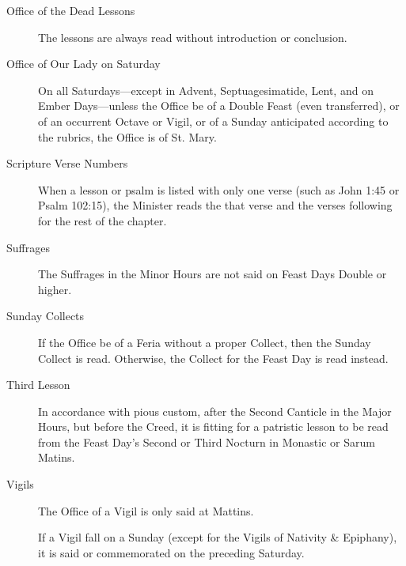 \begin{description}
\item[Office of the Dead Lessons] The lessons are always read without introduction or conclusion.
\item[Office of Our Lady on Saturday] On all Saturdays---except in Advent, Septuagesimatide, Lent, and on Ember Days---unless the Office be of a Double Feast (even transferred), or of an occurrent Octave or Vigil, or of a Sunday anticipated according to the rubrics, the Office is of St. Mary.
\item[Scripture Verse Numbers] When a lesson or psalm is listed with only one verse (such as John 1:45 or Psalm 102:15), the Minister reads the that verse and the verses following for the rest of the chapter.
\item[Suffrages] The Suffrages in the Minor Hours are not said on Feast Days Double or higher.
\item[Sunday Collects] %
If the Office be of a Feria without a proper Collect, then the Sunday Collect is read. Otherwise, the Collect for the Feast Day is read instead.
\item[Third Lesson] In accordance with pious custom, after the Second Canticle in the Major Hours, but before the Creed, it is fitting for a patristic lesson to be read from the Feast Day's Second or Third Nocturn in Monastic or Sarum Matins.
\item[Vigils] %
The Office of a Vigil is only said at Mattins.\par
If a Vigil fall on a Sunday (except for the Vigils of Nativity \& Epiphany), it is said or commemorated on the preceding Saturday.
\end{description}

